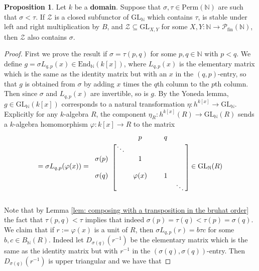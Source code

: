 \documentclass[oneside,11pt]{amsart}
\newcommand{\nn}{\ensuremath{\mathbb{N}}}
\newcommand{\mZ}{\ensuremath{\mathcal{Z}}}
\newcommand{\mP}{\ensuremath{\mathcal{P}}}
\newcommand{\GL}{\ensuremath{\text{GL}}}
\newcommand{\Perm}{\ensuremath{\text{Perm}}}
\newcommand{\End}{\ensuremath{\text{End}}}
\newcommand{\fin}{\ensuremath{\text{fin}}}
\theoremstyle{definition}
\newtheorem{proof techniques}{Proof Techniques}
\newtheorem{proposition}{Proposition}
\begin{document}

\begin{proposition}
Let $k$ be a \textbf{domain}. Suppose that $\sigma , \tau \in \Perm(\nn)$ are such that $\sigma < \tau$. If $\mathcal{Z}$ is a closed subfunctor of $\GL_\nn$ which contains $\tau$, is stable under left and right multiplication by $B$, and $\mZ \subseteq \GL_{X , Y}$ for some $X , Y : \nn \to \mP_\fin(\nn)$, then $\mathcal{Z}$ also contains $\sigma$. 
\end{proposition}

\begin{proof}
First we prove the result if $\sigma = \tau (p , q)$ for some $p , q \in \nn$ with $p < q$. We define $g = \sigma L_{q,p}(x) \in \End_\nn(k[x])$, where $L_{q,p}(x)$ is the elementary matrix which is the same as the identity matrix but with an $x$ in the $( q, p )$-entry, so that $g$ is obtained from $\sigma$ by adding $x$ times the $q$th column to the $p$th column. Then since $\sigma$ and $L_{q,p}(x)$ are invertible, so is $g$. By the Yoneda lemma, $g \in \GL_\nn(k[x])$ corresponds to a natural transformation $\eta: h^{k[x]} \to \GL_\nn$. Explicitly for any $k$-algebra $R$, the component $\eta_R : h^{k[x]}(R) \to \GL_\nn(R)$ sends a $k$-algebra homomorphism $\varphi : k[x] \to R$ to the matrix   
\begin{equation*}
[\varphi(g_{i, j})] = \sigma L_{q,p}(\varphi(x)) = 
\begin{blockarray}{cccccc}
&  & p &  & q &  \\
\begin{block}{c[ccccc]}
  & \ddots &  &  &  &  \\
 \sigma(p)  &  & 1 &  &  &  \\
   &  &  &  &  &  \\
 \sigma(q)  &  & \varphi(x) &  & 1 &  \\
   &  &  &  &  & \ddots \\
\end{block}
\end{blockarray} \in \GL_\nn(R)
\end{equation*}
Note that by Lemma \ref{lem: composing with a transposition in the bruhat order} the fact that $\tau (p , q) < \tau$ implies that indeed $\sigma(p) = \tau(q) < \tau(p) = \sigma(q)$. We claim that if $r := \varphi(x)$ is a unit of $R$, then $\sigma L_{q,p}(r) = b \tau c$ for some $b , c \in B_\nn(R)$. Indeed let $D_{\sigma(q)}(r^{-1})$ be the elementary matrix which is the same as the identity matrix but with $r^{-1}$ in the $(\sigma(q), \sigma(q))$-entry. Then $D_{\sigma(q)}(r^{-1})$ is upper triangular and we have that 

\end{proof}
\end{document}
